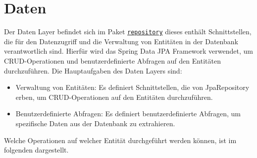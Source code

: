 
\chapter{Daten}
\label{ch:data}

Der Daten Layer befindet sich im Paket \hyperref[edu.kit.hci.soli.repository]{\texttt{repository}} dieses enthält Schnittstellen, die für den Datenzugriff und die Verwaltung von Entitäten in der Datenbank verantwortlich sind. 
Hierfür wird das Spring Data JPA Framework verwendet, um \gls{CRUD}-Operationen und benutzerdefinierte Abfragen auf den Entitäten durchzuführen.  
Die Hauptaufgaben des Daten Layers sind:

\begin{itemize}
    \item Verwaltung von Entitäten: Es definiert Schnittstellen, die von JpaRepository erben, um CRUD-Operationen auf den Entitäten durchzuführen.
    \item Benutzerdefinierte Abfragen: Es definiert benutzerdefinierte Abfragen, um spezifische Daten aus der Datenbank zu extrahieren.
\end{itemize}

Welche Operationen auf welcher Entität durchgeführt werden können, ist im folgenden dargestellt. 

